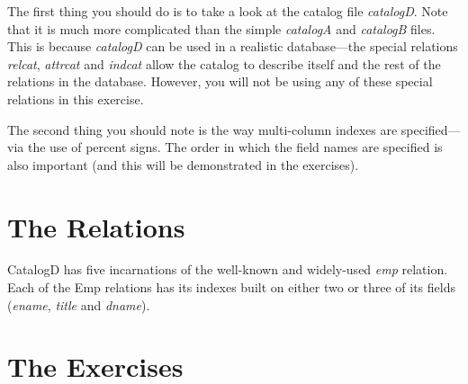 The first thing you should do is to take a look at the catalog file
{\em catalogD}.  Note that it is much more complicated than the simple
{\em catalogA} and {\em catalogB} files.  This is because {\em catalogD}
can be used in a realistic database---the special relations {\em relcat},
{\em attrcat} and {\em indcat} allow the catalog to describe itself and
the rest of the relations in the database.  However, you will not be
using any of these special relations in this exercise.

The second thing you should note is the way multi-column indexes are
specified---via the use of percent signs.  The order in which the field
names are specified is also important (and this will be demonstrated in
the exercises).

\section{The Relations}

CatalogD has five incarnations of the well-known and widely-used {\em emp}
relation.  Each of the Emp relations has its indexes built on either two
or three of its fields ({\em ename}, {\em title} and {\em dname}).


\section{The Exercises}

